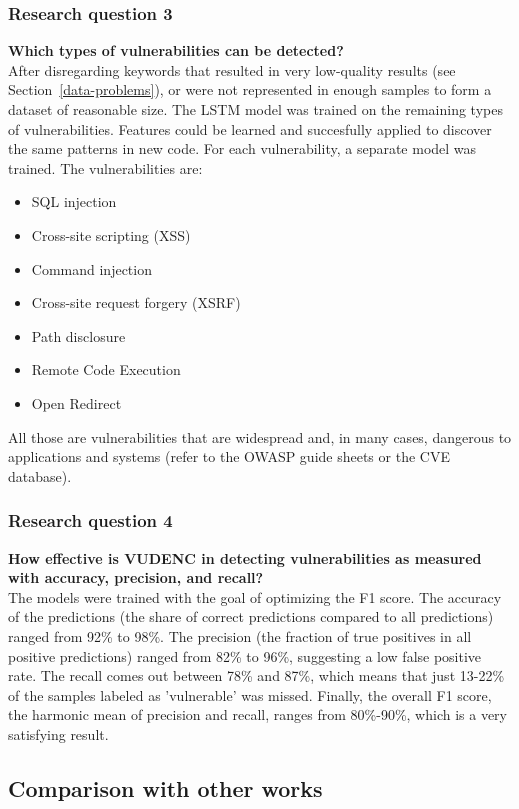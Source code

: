 \documentclass[
a4paper,
pagesize,
pdftex,
12pt,
ngerman,
fleqn,
final,
]{scrartcl}
\begin{document}
	\subsubsection{Research question 3}
	\textbf{Which types of vulnerabilities can be detected?}\\
	After disregarding keywords that resulted in very low-quality results (see Section~\ref{data-problems}), or were not represented in enough samples to form a dataset of reasonable size. The LSTM model was trained on the remaining types of vulnerabilities. Features could be learned and succesfully applied to discover the same patterns in new code. For each vulnerability, a separate model was trained. The vulnerabilities are:
	\begin{itemize}
		\item SQL injection
		\item Cross-site scripting (XSS)
		\item Command injection
		\item Cross-site request forgery (XSRF)
		\item Path disclosure
		\item Remote Code Execution
		\item Open Redirect
	\end{itemize}
	All those are vulnerabilities that are widespread and, in many cases, dangerous to applications and systems (refer  to the OWASP guide sheets or the CVE database). 
	
	\subsubsection{Research question 4}
	\textbf{How effective is VUDENC in detecting vulnerabilities as measured with accuracy, precision, and recall? }\\
	 The models were trained with the goal of optimizing the F1 score. The accuracy of the predictions (the share of correct predictions compared to all predictions) ranged from 92\% to 98\%. The precision (the fraction of true positives in all positive predictions) ranged from 82\% to 96\%, suggesting a low false positive rate. The recall comes out between 78\% and 87\%, which means that just 13-22\% of the samples labeled as 'vulnerable' was missed. Finally, the overall F1 score, the harmonic mean of precision and recall, ranges from 80\%-90\%, which is a very satisfying result.
	
	\subsection{Comparison with other works}
	
\end{document}
